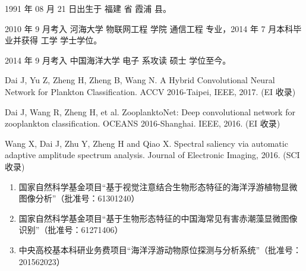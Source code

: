 \begin{resume}


  1991 年 08 月 21 日出生于 福建 省 霞浦 县。

  2010 年 9 月考入 河海大学 物联网工程 学院 通信工程 专业，2014 年 7 月本科毕业并获得 工学 学士学位。

  2014 年 9 月考入 中国海洋大学 电子 系攻读 硕士 学位至今。


     
  \begin{enumerate}[{[}1{]}]
  \item Dai J, Yu Z, Zheng H, Zheng B, Wang N. A Hybrid Convolutional Neural Network for Plankton Classification. ACCV 2016-Taipei, IEEE, 2017. (EI 收录)
  \item Dai J, Wang R, Zheng H, et al. ZooplanktoNet: Deep convolutional network for zooplankton classification. OCEANS 2016-Shanghai. IEEE, 2016. (EI 收录)
  \item Wang X, Dai J, Zhu Y, Zheng H and Qiao X. Spectral saliency via automatic adaptive amplitude spectrum analysis. Journal of Electronic Imaging, 2016. (SCI 收录)
  \end{enumerate}

  \begin{enumerate}
  \item 国家自然科学基金项目“基于视觉注意结合生物形态特征的海洋浮游植物显微图像分析”（批准号：61301240）
  \item 国家自然科学基金项目“基于生物形态特征的中国海常见有害赤潮藻显微图像识别”（批准号：61271406）
  \item 中央高校基本科研业务费项目“海洋浮游动物原位探测与分析系统”（批准号：201562023）
  \end{enumerate}
  


\end{resume}
